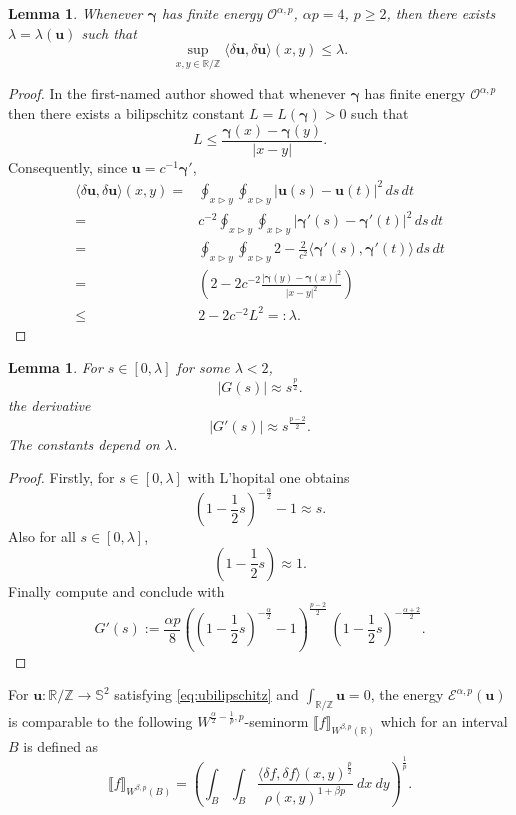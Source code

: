 \documentclass[a4paper,10pt,intlimits,ngerman]{amsart}
\newcommand{\iv}{B} %
\newtheorem{lemma}[theorem]{Lemma}
\numberwithin{equation}{section}
\newcommand{\R}{\mathbb{R}}
\newcommand{\Z}{\mathbb{Z}}
\renewcommand{\S}{\mathbb{S}}
\newcommand{\sol}{{\boldsymbol{\gamma}}}
\newcommand{\solu}{{\boldsymbol{u}}}
\newcommand{\aeq}{\approx}
\newcommand{\brac}[1]{\left ( #1 \right )}
\newcommand{\go}[2]{#1\rhd#2}
\newcommand{\igo}[2]{\oint_{\go{#1}{#2}}}
\newcommand{\dmv}[2]{\langle \delta #1, \delta #2\rangle}
\begin{document}
\begin{lemma}\label{la:lambda}
Whenever $\sol$ has finite energy $\mathcal{O}^{\alpha,p}$, $\alpha p = 4$, $p \geq 2$, then there exists $\lambda = \lambda(\solu)$ such that
\begin{equation}\label{eq:ubilipschitz}
 \sup_{x,y \in \R / \Z} \dmv{\solu}{\solu}(x,y) \leq \lambda.
\end{equation}
 \end{lemma}
\begin{proof}
In \cite[Lemma 2.1]{Blatt12} the first-named author showed that whenever $\sol$ has finite energy $\mathcal{O}^{\alpha,p}$ then there exists a bilipschitz constant $L = L(\sol) > 0$ such that
\[
 L \leq \frac{\sol(x)-\sol(y)}{|x-y|}.
\]
Consequently, since $\solu = c^{-1} \sol'$,
\[
\begin{split}
 \dmv{\solu}{\solu}(x,y)= &\igo{x}{y} \igo{x}{y} |\solu(s)-\solu(t)|^2\, ds\, dt\\
 =& c^{-2} \igo{x}{y} \igo{x}{y} |\sol'(s)-\sol'(t)|^2\, ds\, dt\\
 =& \igo{x}{y} \igo{x}{y} 2-\frac{2}{c^2} \langle \sol'(s), \sol'(t)\rangle \, ds\, dt\\
=&\brac{ 2-2 c^{-2}\frac{|\sol(y)-\sol(x)|^2}{|x-y|^2}}\\
\leq& 2-2 c^{-2}L^2 =: \lambda.
\end{split}
 \]
\end{proof}
% 
\begin{lemma}\label{la:Gpest}
For $s \in [0,\lambda]$ for some $\lambda < 2$,
\[
 |G(s)| \aeq s^{\frac{p}{2}}.
\]
the derivative
\[
 |G'(s)| \aeq s^{\frac{p-2}{2}}.
\]
The constants depend on $\lambda$.
\end{lemma}
\begin{proof}
Firstly, for $s \in [0,\lambda]$ with L'hopital one obtains
\[
 \brac{1- \frac{1}{2} s}^{-\frac{\alpha}{2}}  -1 \aeq s.
\]
Also for all $s \in [0,\lambda]$,
\[
 (1- \frac{1}{2} s) \aeq 1.
\]
Finally compute and conclude with
\[
 G'(s) := \frac{\alpha p}{8} \brac{\brac{1- \frac{1}{2} s}^{-\frac{\alpha}{2}}  -1}^{\frac{p-2}{2}}\ \brac{1- \frac{1}{2} s}^{-\frac{\alpha+2}{2}}.
\]
\end{proof}
% 
For $\solu: \R/\Z \to \S^2$ satisfying \eqref{eq:ubilipschitz} and $\int_{\R/\Z} \solu = 0$, the energy $\mathcal{E}^{\alpha,p}(\solu)$ is comparable to the following $W^{\frac{\alpha}{2}-\frac{1}{p},p}$-seminorm $\llbracket f \rrbracket_{W^{\beta,p}(\R)}$ which for an interval $\iv$ is defined as
\[
 \llbracket f \rrbracket_{W^{\beta,p}(\iv)} = \brac{\int_{\iv}\int_{\iv} \frac{\dmv{f}{f}(x,y)^{\frac{p}{2}}}{\rho(x,y)^{1+\beta p}}\ dx\ dy}^{\frac{1}{p}}.
\]
\end{document}
